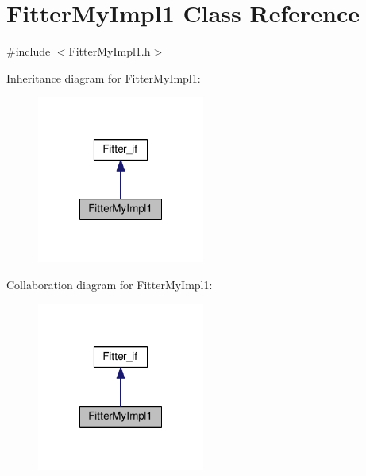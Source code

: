 \hypertarget{class_fitter_my_impl1}{\section{Fitter\-My\-Impl1 Class Reference}
\label{class_fitter_my_impl1}
}


{\ttfamily \#include $<$Fitter\-My\-Impl1.\-h$>$}



Inheritance diagram for Fitter\-My\-Impl1\-:
\nopagebreak
\begin{figure}[H]
\begin{center}
\leavevmode
\includegraphics[width=156pt]{class_fitter_my_impl1__inherit__graph}
\end{center}
\end{figure}


Collaboration diagram for Fitter\-My\-Impl1\-:
\nopagebreak
\begin{figure}[H]
\begin{center}
\leavevmode
\includegraphics[width=156pt]{class_fitter_my_impl1__coll__graph}
\end{center}
\end{figure}
